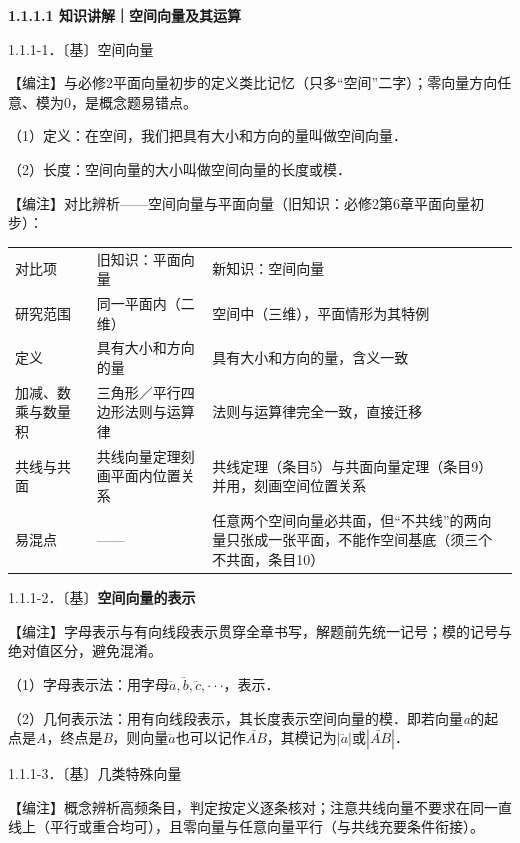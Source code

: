 \textbf{1.1.1.1 知识讲解｜空间向量及其运算}

1.1.1-1．〔基〕空间向量

【⁠编⁠注⁠】与必修2平面向量初步的定义类比记忆（只多``空间''二字）；零向量方向任意、模为0，是概念题易错点。

（1）定义：在空间，我们把具有大小和方向的量叫做空间向量．

（2）长度：空间向量的大小叫做空间向量的长度或模．

【⁠编⁠注⁠】对比辨析------空间向量与平面向量（旧知识：必修2第6章平面向量初步）：

{\def\LTcaptype{none} %
\begin{longtable}[]{@{}
  >{\raggedright\arraybackslash}p{}
  >{\raggedright\arraybackslash}p{}
  >{\raggedright\arraybackslash}p{}@{}}
\toprule\noalign{}
\endhead
\bottomrule\noalign{}
\endlastfoot
对比项 & 旧知识：平面向量 & 新知识：空间向量 \\
研究范围 & 同一平面内（二维） & 空间中（三维），平面情形为其特例 \\
定义 & 具有大小和方向的量 & 具有大小和方向的量，含义一致 \\
加减、数乘与数量积 & 三角形／平行四边形法则与运算律 &
法则与运算律完全一致，直接迁移 \\
共线与共面 & 共线向量定理刻画平面内位置关系 &
共线定理（条目5）与共面向量定理（条目9）并用，刻画空间位置关系 \\
易混点 & ------ &
任意两个空间向量必共面，但``不共线''的两向量只张成一张平面，不能作空间基底（须三个不共面，条目10） \\
\end{longtable}
}

1.1.1-2．〔基〕\textbf{空间向量的表示}

【⁠编⁠注⁠】字母表示与有向线段表示贯穿全章书写，解题前先统一记号；模的记号与绝对值区分，避免混淆。

（1）字母表示法：用字母\(\overset{⃑}{a},\overset{⃑}{b},\overset{⃑}{c}, \cdot \cdot \cdot\)，表示．

（2）几何表示法：用有向线段表示，其长度表示空间向量的模．即若向量\emph{a}的起点是\emph{A}，终点是\emph{B}，则向量\(\overset{⃑}{a}\)也可以记作\(\overset{⃑}{AB}\)，其模记为\(\left| \overset{⃑}{a} \right|\)或\(\left| \overset{⃑}{AB} \right|\)．

1.1.1-3．〔基〕几类特殊向量

【⁠编⁠注⁠】概念辨析高频条目，判定按定义逐条核对；注意共线向量不要求在同一直线上（平行或重合均可），且零向量与任意向量平行（与共线充要条件衔接）。

